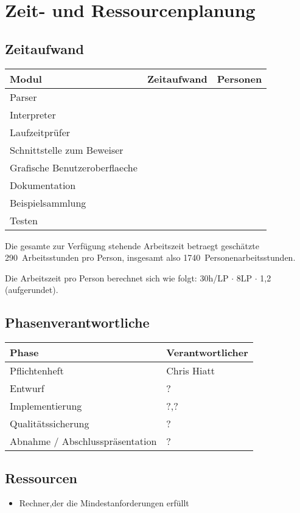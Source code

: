 \section{Zeit- und Ressourcenplanung}%

\subsection{Zeitaufwand}%

  \begin{tabular}{| l | l | l | }
    \hline
    \textbf{Modul} & \textbf{Zeitaufwand} & \textbf{Personen} \\ \hline
    Parser &  &  \\ \hline
    Interpreter &  &  \\ \hline
    Laufzeitprüfer &  &  \\ \hline
    Schnittstelle zum Beweiser &  &  \\ \hline
    Grafische Benutzeroberflaeche &  &  \\ \hline
    Dokumentation &  &  \\ \hline
    Beispielsammlung &  &  \\ \hline
    Testen &  &  \\ \hline %
  \end{tabular}

Die gesamte zur Verfügung stehende Arbeitszeit betraegt geschätzte 290~Arbeitsstunden pro Person, insgesamt also 1740~Personenarbeitsstunden.

Die Arbeitszeit pro Person berechnet sich wie folgt: 30h/LP $\cdot$ 8LP $\cdot$ 1,2 (aufgerundet).

\subsection{Phasenverantwortliche}%

  \begin{tabular}{| l | l | }
    \hline
    \textbf{Phase} & \textbf{Verantwortlicher} \\ \hline
    Pflichtenheft & Chris Hiatt \\ \hline
    Entwurf & ? \\ \hline
    Implementierung & ?,? \\ \hline
    Qualitätssicherung & ? \\ \hline
    Abnahme / Abschlusspräsentation & ? \\ \hline
  \end{tabular}

\subsection{Ressourcen}%

\begin{itemize}%
    \item Rechner,der die Mindestanforderungen erfüllt
\end{itemize}%
